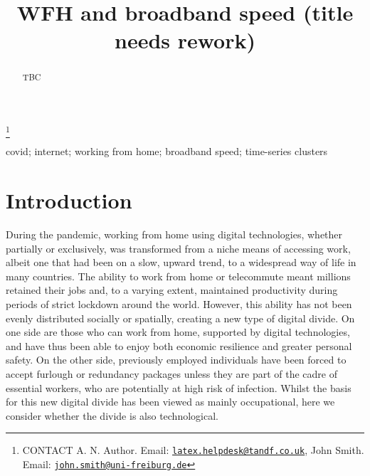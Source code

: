 \documentclass[]{interact}
\theoremstyle{plain}%
\theoremstyle{definition}
\theoremstyle{remark}
\begin{document}

\title{WFH and broadband speed (title needs rework)}


\author{
}

\thanks{CONTACT A. N. Author. Email: \href{mailto:latex.helpdesk@tandf.co.uk}{\nolinkurl{latex.helpdesk@tandf.co.uk}}, John Smith. Email: \href{mailto:john.smith@uni-freiburg.de}{\nolinkurl{john.smith@uni-freiburg.de}}}

\maketitle

\begin{abstract}
TBC
\end{abstract}

\begin{keywords}
covid; internet; working from home; broadband speed; time-series
clusters
\end{keywords}

\hypertarget{introduction}{%
\section{Introduction}\label{introduction}}

During the pandemic, working from home using digital technologies,
whether partially or exclusively, was transformed from a niche means of
accessing work, albeit one that had been on a slow, upward trend, to a
widespread way of life in many countries. The ability to work from home
or telecommute meant millions retained their jobs and, to a varying
extent, maintained productivity during periods of strict lockdown around
the world. However, this ability has not been evenly distributed
socially or spatially, creating a new type of digital divide. On one
side are those who can work from home, supported by digital
technologies, and have thus been able to enjoy both economic resilience
and greater personal safety. On the other side, previously employed
individuals have been forced to accept furlough or redundancy packages
unless they are part of the cadre of essential workers, who are
potentially at high risk of infection. Whilst the basis for this new
digital divide has been viewed as mainly occupational, here we consider
whether the divide is also technological.
\end{document}
